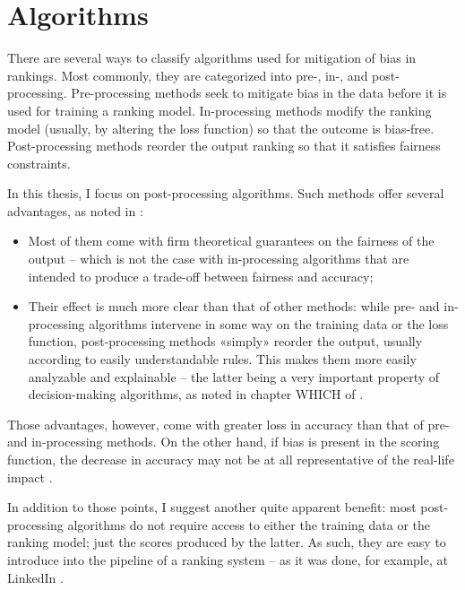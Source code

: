 

\newcommand{\Prob}{\text{I\kern-0.15em P}}


\chapter{Algorithms}\label{chapt:algorithms}

There are several ways to classify algorithms used for mitigation of bias in rankings. Most commonly, they are categorized into pre-, in-, and post-processing. Pre-processing methods seek to mitigate bias in the data before it is used for training a ranking model. In-processing methods modify the ranking model (usually, by altering the loss function) so that the outcome is bias-free. Post-processing methods reorder the output ranking so that it satisfies fairness constraints.

In this thesis, I focus on post-processing algorithms. Such methods offer several advantages, as noted in \cite{3533380}:
\begin{itemize}
\item Most of them come with firm theoretical guarantees on the fairness of the output – which is not the case with in-processing algorithms that are intended to produce a trade-off between fairness and accuracy;
\item Their effect is much more clear than that of other methods: while pre- and in-processing algorithms intervene in some way on the training data or the loss function, post-processing methods «simply» reorder the output, usually according to easily understandable rules. This makes them more easily analyzable and explainable – the latter being a very important property of decision-making algorithms, as noted in chapter WHICH of \cite{fairmlbook}.
\end{itemize}
Those advantages, however, come with greater loss in accuracy than that of pre- and in-processing methods. On the other hand, if bias is present in the scoring function, the decrease in accuracy may not be at all representative of the real-life impact \cite{3533380}.

In addition to those points, I suggest another quite apparent benefit: most post-processing algorithms do not require access to either the training data or the ranking model; just the scores produced by the latter. As such, they are easy to introduce into the pipeline of a ranking system – as it was done, for example, at LinkedIn \cite{linkedin}.

